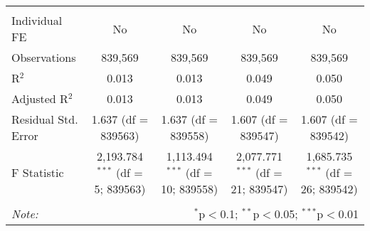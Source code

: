 \documentclass[
]{article}
\begin{document}
\begin{table}[!htbp]
{\begin{tabular}{@{\extracolsep{5pt}}lcccc}
\hline \\[-1.8ex] 
Individual FE & No & No & No & No \\ 
Observations & 839,569 & 839,569 & 839,569 & 839,569 \\ 
R$^{2}$ & 0.013 & 0.013 & 0.049 & 0.050 \\ 
Adjusted R$^{2}$ & 0.013 & 0.013 & 0.049 & 0.050 \\ 
Residual Std. Error & 1.637 (df = 839563) & 1.637 (df = 839558) & 1.607 (df = 839547) & 1.607 (df = 839542) \\ 
F Statistic & 2,193.784$^{***}$ (df = 5; 839563) & 1,113.494$^{***}$ (df = 10; 839558) & 2,077.771$^{***}$ (df = 21; 839547) & 1,685.735$^{***}$ (df = 26; 839542) \\ 
\hline 
\hline \\[-1.8ex] 
\textit{Note:}  & \multicolumn{4}{r}{$^{*}$p$<$0.1; $^{**}$p$<$0.05; $^{***}$p$<$0.01} \\ 
\end{tabular}
} 
\end{table} 
\newpage
\end{document}
